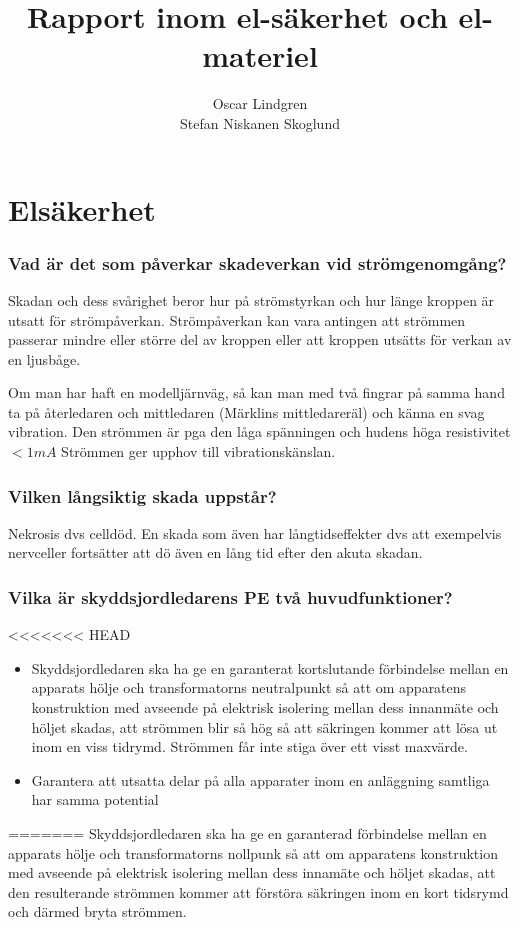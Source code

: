\documentclass[a4paper,swedish]{article}
\title{Rapport inom el-säkerhet och el-materiel}
\author{Oscar Lindgren\\Stefan Niskanen Skoglund}
\begin{document}
\part{Elsäkerhet}
\setcounter{section}{1}
\section{Vad är det som påverkar skadeverkan vid strömgenomgång?} \label{sec:strömgenomgång}

Skadan och dess svårighet beror hur på strömstyrkan och hur länge kroppen är utsatt för strömpåverkan.
Strömpåverkan kan vara antingen att strömmen passerar mindre eller större del av kroppen eller att kroppen
utsätts för verkan av en ljusbåge.

Om man har haft en modelljärnväg, så kan man med två fingrar på samma hand ta på återledaren och mittledaren (Märklins mittledareräl) och känna en svag
vibration. Den strömmen är pga den låga spänningen och hudens höga resistivitet $< 1 mA$
Strömmen ger upphov till vibrationskänslan.

\setcounter{section}{3}
\section{Vilken långsiktig skada uppstår?}\label{sec:permanent_skada}

Nekrosis dvs celldöd. En skada som även har långtidseffekter dvs att exempelvis nervceller
fortsätter att dö även en lång tid efter den akuta skadan.

\setcounter{section}{5}
\section{Vilka är skyddsjordledarens PE två huvudfunktioner?}\label{sec:skyddsjordsledarens_funktioner}

<<<<<<< HEAD
\begin{itemize}
\item Skyddsjordledaren ska ha ge en garanterat kortslutande förbindelse mellan en apparats hölje
och transformatorns neutralpunkt så att om apparatens konstruktion
med avseende på elektrisk isolering mellan dess innanmäte och höljet skadas, att strömmen
blir så hög så att säkringen kommer att lösa ut inom en viss tidrymd. Strömmen får inte stiga
över ett visst maxvärde.
\item Garantera att utsatta delar på alla apparater inom en anläggning samtliga har samma potential
\end{itemize}
=======
Skyddsjordledaren ska ha ge en garanterad förbindelse mellan en apparats hölje och transformatorns nollpunk
så att om apparatens konstruktion
med avseende på elektrisk isolering mellan dess innamäte och höljet skadas, att den resulterande strömmen
kommer att förstöra säkringen inom en kort tidsrymd och därmed bryta strömmen.
\end{document}
